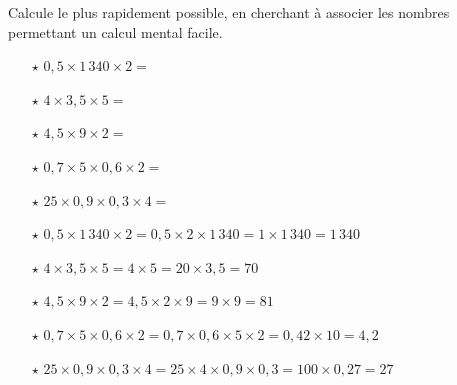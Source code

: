 Calcule le plus rapidement possible, en cherchant à associer les nombres permettant un calcul mental facile.
\begin{itemize}
\item[$\star$] $0,5\times1\,340\times2=$\dotfill
\item[$\star$] $4\times3,5\times5=$\dotfill
\item[$\star$] $4,5\times9\times2=$\dotfill
\item[$\star$] $0,7\times5\times0,6\times2=$\dotfill
\item[$\star$] $25\times0,9\times0,3\times4=$\dotfill
\end{itemize}
\begin{itemize}
\item[$\star$] $0,5\times1\,340\times2=0,5\times2\times1\,340=1\times1\,340=1\,340$
\item[$\star$] $4\times3,5\times5=4\times5=20\times3,5=70$
\item[$\star$] $4,5\times9\times2=4,5\times2\times9=9\times9=81$
\item[$\star$] $0,7\times5\times0,6\times2=0,7\times0,6\times5\times2=0,42\times10=4,2$
\item[$\star$] $25\times0,9\times0,3\times4=25\times4\times0,9\times0,3=100\times0,27=27$
\end{itemize}